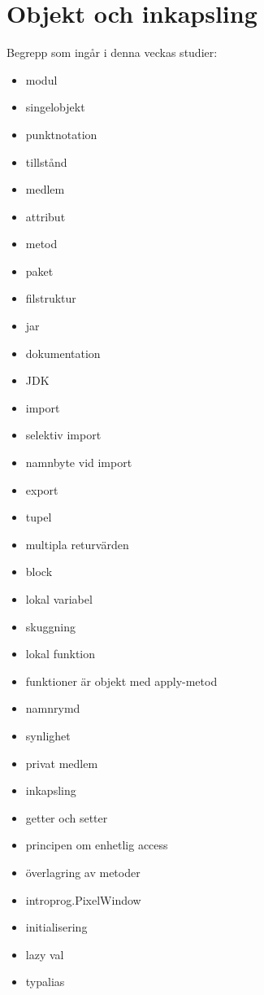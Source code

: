 \chapter{Objekt och inkapsling}\label{chapter:W04}
Begrepp som ingår i denna veckas studier:
\begin{multicols}{2}\begin{itemize}[noitemsep,label={$\square$},leftmargin=*]
\item modul
\item singelobjekt
\item punktnotation
\item tillstånd
\item medlem
\item attribut
\item metod
\item paket
\item filstruktur
\item jar
\item dokumentation
\item JDK
\item import
\item selektiv import
\item namnbyte vid import
\item export
\item tupel
\item multipla returvärden
\item block
\item lokal variabel
\item skuggning
\item lokal funktion
\item funktioner är objekt med apply-metod
\item namnrymd
\item synlighet
\item privat medlem
\item inkapsling
\item getter och setter
\item principen om enhetlig access
\item överlagring av metoder
\item introprog.PixelWindow
\item initialisering
\item lazy val
\item typalias\end{itemize}\end{multicols}
